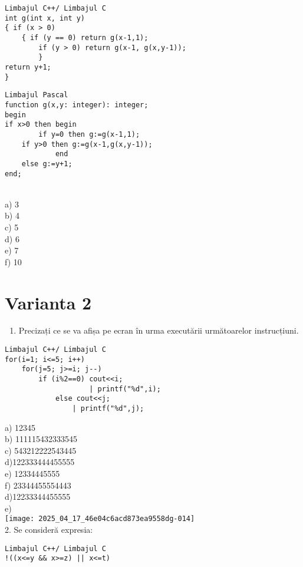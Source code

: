 \begin{verbatim}
Limbajul C++/ Limbajul C
int g(int x, int y)
{ if (x > 0)
    { if (y == 0) return g(x-1,1);
        if (y > 0) return g(x-1, g(x,y-1));
        }
return y+1;
}
\end{verbatim}
\begin{verbatim}
Limbajul Pascal
function g(x,y: integer): integer;
begin
if x>0 then begin
        if y=0 then g:=g(x-1,1);
    if y>0 then g:=g(x-1,g(x,y-1));
            end
    else g:=y+1;
end;
\end{verbatim}
\\
a) 3
\\
b) 4
\\
c) 5
\\
d) 6
\\
e) 7
\\
f) 10
\\

\section*{Varianta 2}
\begin{enumerate}
  \item Precizați ce se va afișa pe ecran în urma executării următoarelor instrucțiuni.
\end{enumerate}

\begin{verbatim}
Limbajul C++/ Limbajul C
for(i=1; i<=5; i++)
    for(j=5; j>=i; j--)
        if (i%2==0) cout<<i;
                    | printf("%d",i);
            else cout<<j;
                | printf("%d",j);
\end{verbatim}

a) 12345\\
b) 111115432333545\\
c) 543212222543445\\
d)122333444455555\\
e) 12334445555\\
f) 23344455554443\\
d)12233344455555\\
e)\\
\texttt{[image: 2025\_04\_17\_46e04c6acd873ea9558dg-014]}\\
2. Se consideră expresia:

\begin{verbatim}
Limbajul C++/ Limbajul C
!((x<=y && x>=z) || x<=t)
\end{verbatim}

